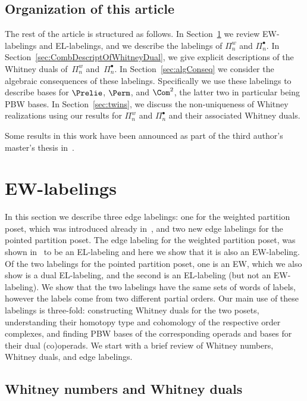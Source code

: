   

\subsection{Organization of this article}

The rest of the article is structured as follows. In Section~\ref{sec:EWLab} we review EW-labelings and EL-labelings, and we describe the labelings of $\Pi_n^w$ and $\Pi_n^\bullet$.  In Section~\ref{sec:CombDescriptOfWhitneyDual}, we give explicit descriptions of the Whitney duals of~$\Pi_n^w$ and~$\Pi_n^\bullet$.  In Section~\ref{sec:algConseq} we consider the algebraic consequences of these labelings. Specifically we use these labelings to describe bases for $\Prelie$, $\Perm$, and $\Com^2$, the latter two in particular being PBW bases.  In Section~\ref{sec:twins}, we discuss  the non-uniqueness  of Whitney realizations using our results for $\Pi_n^w$ and $\Pi_n^\bullet$ and their associated Whitney duals. 

Some results in this work have been announced as part of the third author's master's thesis in~\cite{QuicenoDuran2020}.
 



\section{EW-labelings}\label{sec:EWLab}
In this section we describe three edge labelings: one for the weighted partition poset, which was introduced already in~\cite{GonzalezDleonWachs2016}, and two new edge labelings for the pointed partition poset. The edge labeling for the weighted partition poset, was shown in~\cite{GonzalezDleonWachs2016} to be an EL-labeling and here we show that it is also an EW-labeling. Of the two labelings for the pointed partition poset, one is an EW, which we also show is a dual EL-labeling, and the second is an EL-labeling (but not an EW-labeling). We show that the two labelings have  the same sets of words of labels, however the labels come from two different partial orders.   Our main use of these labelings is three-fold: constructing Whitney duals for the two posets, understanding their homotopy type and cohomology of the respective order complexes, and finding PBW bases of the corresponding operads and bases for their dual (co)operads.    We start with a brief review of Whitney numbers, Whitney duals, and  edge labelings.

\subsection{Whitney numbers and Whitney duals}


